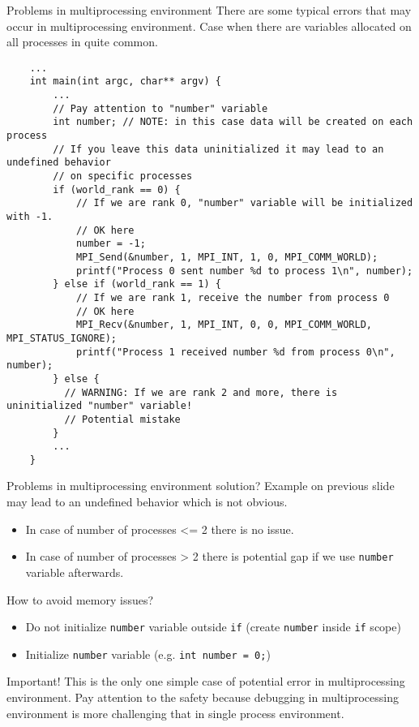 \documentclass{beamer}
\begin{document}
\begin{frame}[fragile]{Problems in multiprocessing environment}
  There are some typical errors that may occur in multiprocessing environment.
  Case when there are variables allocated on all processes in quite common.
  \lstset{style=CStyle, caption=Common variables usage example}
  \begin{lstlisting}
    ...
    int main(int argc, char** argv) {
        ...
        // Pay attention to "number" variable
        int number; // NOTE: in this case data will be created on each process
        // If you leave this data uninitialized it may lead to an undefined behavior
        // on specific processes
        if (world_rank == 0) {
            // If we are rank 0, "number" variable will be initialized with -1.
            // OK here
            number = -1;
            MPI_Send(&number, 1, MPI_INT, 1, 0, MPI_COMM_WORLD);
            printf("Process 0 sent number %d to process 1\n", number);
        } else if (world_rank == 1) {
            // If we are rank 1, receive the number from process 0
            // OK here
            MPI_Recv(&number, 1, MPI_INT, 0, 0, MPI_COMM_WORLD, MPI_STATUS_IGNORE);
            printf("Process 1 received number %d from process 0\n", number);
        } else {
          // WARNING: If we are rank 2 and more, there is uninitialized "number" variable!
          // Potential mistake
        }
        ...
    }
  \end{lstlisting}
\end{frame}

\begin{frame}[fragile]{Problems in multiprocessing environment solution?}
  Example on previous slide may lead to an undefined behavior which is not obvious.

  \begin{itemize}
    \item In case of number of processes <= 2 there is no issue.
    \item In case of number of processes > 2 there is potential gap if we use \texttt{number} variable afterwards.
  \end{itemize}

  How to avoid memory issues?
  \begin{itemize}
    \item Do not initialize \texttt{number} variable outside \texttt{if} (create \texttt{number} inside \texttt{if} scope)
    \item Initialize \texttt{number} variable (e.g. \texttt{int number = 0;})
  \end{itemize}

  Important! This is the only one simple case of potential error in multiprocessing environment.
  Pay attention to the safety because debugging in multiprocessing environment is more challenging that in single process environment.
\end{frame}
\end{document}

